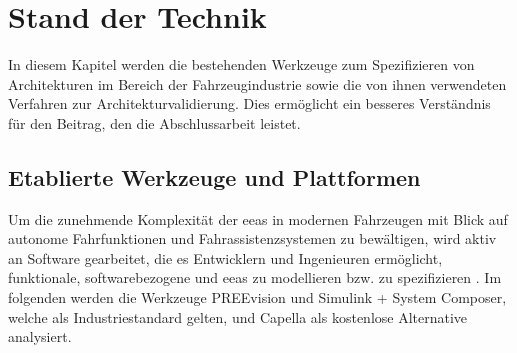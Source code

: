 
\chapter{Stand der Technik}
\label{sect:relatedWork}


In diesem Kapitel werden die bestehenden Werkzeuge zum Spezifizieren von Architekturen im Bereich der Fahrzeugindustrie sowie die von ihnen verwendeten Verfahren zur Architekturvalidierung. Dies ermöglicht ein besseres Verständnis für den Beitrag, den die Abschlussarbeit leistet.

\section{Etablierte Werkzeuge und Plattformen}
Um die zunehmende Komplexität der \glspl{eea} in modernen Fahrzeugen mit Blick auf autonome Fahrfunktionen und Fahrassistenzsystemen zu bewältigen, wird aktiv an Software gearbeitet, die es Entwicklern und Ingenieuren ermöglicht, funktionale, softwarebezogene und \glspl{eea} zu modellieren bzw. zu spezifizieren \cite{askaripoor2022architecture} \cite{schauffele2016architectural}. Im folgenden werden die Werkzeuge PREEvision und Simulink + System Composer, welche als Industriestandard gelten, und Capella als kostenlose Alternative analysiert.


